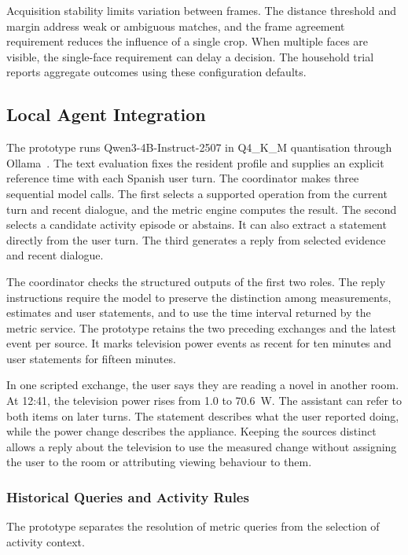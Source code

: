 \documentclass[a4paper,twoside]{article}
\begin{document}
Acquisition stability limits variation between frames. The distance threshold and margin address weak or ambiguous matches, and the frame agreement requirement reduces the influence of a single crop. When multiple faces are visible, the single-face requirement can delay a decision. The household trial reports aggregate outcomes using these configuration defaults.

\subsection{Local Agent Integration}
\label{subsec:case-agents}

The prototype runs Qwen3-4B-Instruct-2507 in Q4\_K\_M quantisation through Ollama~\cite{qwen2025instruct}. The text evaluation fixes the resident profile and supplies an explicit reference time with each Spanish user turn. The coordinator makes three sequential model calls. The first selects a supported operation from the current turn and recent dialogue, and the metric engine computes the result. The second selects a candidate activity episode or abstains. It can also extract a statement directly from the user turn. The third generates a reply from selected evidence and recent dialogue.

The coordinator checks the structured outputs of the first two roles. The reply instructions require the model to preserve the distinction among measurements, estimates and user statements, and to use the time interval returned by the metric service. The prototype retains the two preceding exchanges and the latest event per source. It marks television power events as recent for ten minutes and user statements for fifteen minutes.

In one scripted exchange, the user says they are reading a novel in another room. At 12:41, the television power rises from 1.0 to 70.6~W. The assistant can refer to both items on later turns. The statement describes what the user reported doing, while the power change describes the appliance. Keeping the sources distinct allows a reply about the television to use the measured change without assigning the user to the room or attributing viewing behaviour to them.

\subsubsection{Historical Queries and Activity Rules}
\label{subsec:case-rules}

The prototype separates the resolution of metric queries from the selection of activity context.
\end{document}
